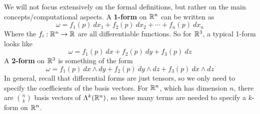 \documentclass{article}
\begin{document}
        We will not focus extensively on the formal definitions, but rather on the main concepts/computational aspects. A \textbf{1-form} on $\mathbb{R}^n$ can be written as 
        \begin{equation*}
            \omega = f_1(p)\ dx_1 + f_2(p)\ dx_2 + \cdots + f_n(p)\ dx_n
        \end{equation*}
        Where the $f_i: \mathbb{R}^n \to \mathbb{R}$ are all differentiable functions. So for $\mathbb{R}^3$, a typical 1-form looks like 
        \begin{equation*}
            \omega = f_1(p)\ dx + f_2(p)\ dy + f_3(p)\ dz 
        \end{equation*}
        A \textbf{2-form} on $\mathbb{R}^3$ is something of the form 
        \begin{equation*}
            \omega = f_1(p)\ dx \wedge dy + f_2(p)\ dy \wedge dz + f_3(p)\ dx \wedge dz 
        \end{equation*}
        In general, recall that differential forms are just tensors, so we only need to specify the coefficients of the basis vectors. For $\mathbb{R}^n$, which has dimension $n$, there are $\binom{n}{k}$ basis vectors of $\Lambda^k(\mathbb{R}^n)$, so these many terms are needed to specify a $k$-form on $\mathbb{R}^n$.
\end{document}
